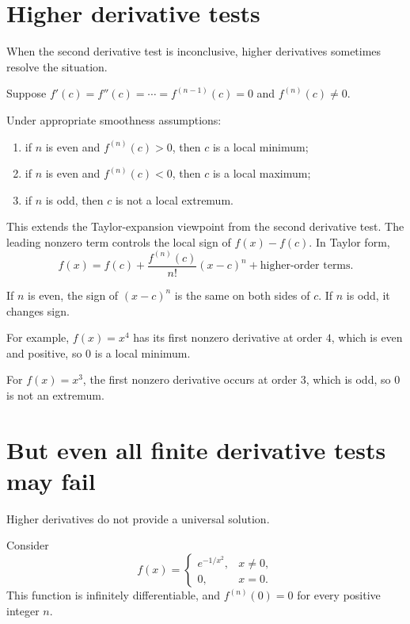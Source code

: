 \documentclass{essay}
\begin{document}
\section{Higher derivative tests}

When the second derivative test is inconclusive, higher derivatives sometimes resolve the situation.

Suppose \(f'(c)=f''(c)=\cdots=f^{(n-1)}(c)=0\) and \(f^{(n)}(c)\neq0\).

Under appropriate smoothness assumptions:

\begin{enumerate}
  \item if \(n\) is even and \(f^{(n)}(c)>0\), then \(c\) is a local minimum;

  \item if \(n\) is even and \(f^{(n)}(c)<0\), then \(c\) is a local maximum;

  \item if \(n\) is odd, then \(c\) is not a local extremum.
\end{enumerate}

This extends the Taylor-expansion viewpoint from the second derivative test. The leading nonzero term controls the local sign of \(f(x)-f(c)\). In Taylor form,
\[ f(x) = f(c) + \frac{f^{(n)}(c)}{n!}(x-c)^{n} + \text{higher-order terms}. \]

If \(n\) is even, the sign of \((x-c)^{n}\) is the same on both sides of \(c\). If \(n\) is odd, it changes sign.

For example, \(f(x)=x^{4}\) has its first nonzero derivative at order \(4\), which is even and positive, so \(0\) is a local minimum.

For \(f(x)=x^{3}\), the first nonzero derivative occurs at order \(3\), which is odd, so \(0\) is not an extremum.

\section{But even all finite derivative tests may fail}

Higher derivatives do not provide a universal solution.

Consider
\[
  f(x)=
  \begin{cases}
    e^{-1/x^{2}}, & x\neq0,\\
    0, & x=0.
  \end{cases}
\]
This function is infinitely differentiable, and \(f^{(n)}(0)=0\) for every positive integer \(n\).
\end{document}
